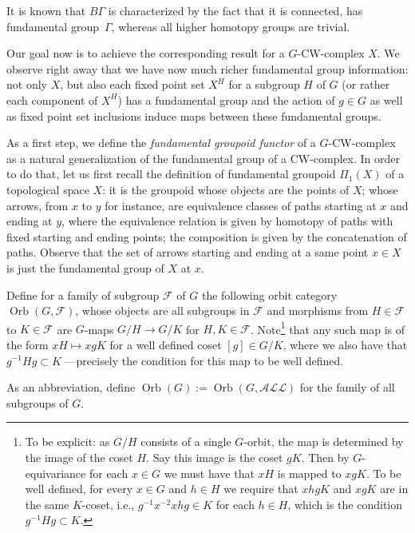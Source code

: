 \documentclass[pdftex]{sigma}
\numberwithin{equation}{section}
\DeclareMathOperator{\Orb}{Orb}
\begin{document}
	It is known that $B\Gamma$ is characterized by the fact that it is
	connected, has fundamental group~$\Gamma$, whereas all higher homotopy
	groups are trivial.
	
	Our goal now is to achieve the corresponding result for a $G$-CW-complex
	$X$. We observe right away that we have now much richer fundamental group
	information: not only $X$, but also each fixed point set $X^H$ for a subgroup
	$H$ of $G$ (or rather each component of $X^H$) has a fundamental group and
	the action of $g\in G$ as well as fixed point set inclusions induce maps between these fundamental groups.
	
	As a first step, we define the \emph{fundamental groupoid functor} of a $G$-CW-complex as a natural generalization of the fundamental group of a CW-complex.
	In order to do that, let us first recall the definition of fundamental groupoid $\Pi_1(X)$ of a topological space $X$: it is the groupoid whose objects are the points of $X$; whose arrows, from $x$ to $y$ for instance, are equivalence classes of paths starting at $x$ and ending at $y$, where the equivalence relation is given by homotopy of paths with fixed starting and ending points; the composition is given by the concatenation of paths. Observe that the set of arrows starting and ending at a same point $x\in X$ is just the fundamental group of $X$ at $x$.
	\begin{Definition}
		Define for a family of subgroup $\mathcal{F}$ of $G$ the following orbit
		category
		$
		\Orb(G,\mathcal{F})
		$,
		whose objects are all subgroups in $\mathcal{F}$ and morphisms from
		$H\in\mathcal{F}$ to $K\in\mathcal{F}$ are $G$-maps
		$G/H\to G/K$ for $H,K\in \mathcal{F}$. Note\footnote{To be explicit: as
			$G/H$ consists of a single $G$-orbit, the map is determined by the image
			of the coset $H$. Say this image is the coset $gK$. Then by
			$G$-equivariance for each $x\in G$ we must have that $xH$ is mapped to
			$xgK$. To be well defined, for every $x\in G$ and $h\in H$ we require that
			$xhgK$ and $xgK$ are in the same $K$-coset, i.e., $g^{-1}x^{-2}xhg\in K$
			for each $h\in H$, which is the condition $g^{-1}Hg\subset K$.} that any such map is of the form $xH\mapsto xgK$ for a
		well defined coset $[g]\in G/K$, where we also have that $g^{-1}Hg \subset
		K$ ---precisely the condition for this map to be well defined.
		
		As an abbreviation, define $\Orb(G):=\Orb(G,\mathcal{ALL})$ for the family
		of all subgroups of $G$.
	\end{Definition}
	
\end{document}
